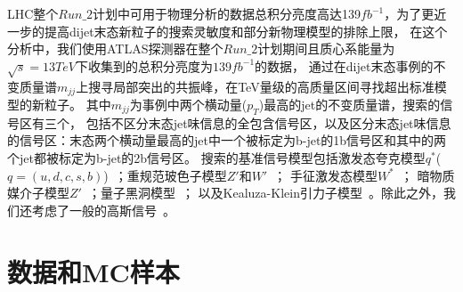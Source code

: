 LHC整个$Run\_2$计划中可用于物理分析的数据总积分亮度高达139$fb^{-1}$，为了更近一步的提高dijet末态新粒子的搜索灵敏度和部分新物理模型的排除上限，
在这个分析中，我们使用ATLAS探测器在整个$Run\_2$计划期间且质心系能量为$\sqrt{s}=13TeV$下收集到的总积分亮度为$139fb^{-1}$的数据，
通过在dijet末态事例的不变质量谱$m_{jj}$上搜寻局部突出的共振峰，在TeV量级的高质量区间寻找超出标准模型的新粒子。
其中$m_{jj}$为事例中两个横动量($p_{T}$)最高的jet的不变质量谱，搜索的信号区有三个，
包括不区分末态jet味信息的全包含信号区，以及区分末态jet味信息的信号区：末态两个横动量最高的jet中一个被标定为b-jet的1b信号区和其中的两个jet都被标定为b-jet的2b信号区。
搜索的基准信号模型包括激发态夸克模型$q^*$($q=(u,d,c,s,b)$)~\cite{qstar1,qstar2}；重规范玻色子模型$Z\prime$和$W\prime$~\cite{zprime1,zprime3,wprime1}；
手征激发态模型$W^*$~\cite{Chizhov:2009fc,Chizhov:2010jg}；
暗物质媒介子模型$Z\prime$~\cite{DM1,DM2,DM3}；量子黑洞模型~\cite{qbh1,qbh2}；
以及Kealuza-Klein引力子模型~\cite{RS1,RS2}。除此之外，我们还考虑了一般的高斯信号~\cite{EXOT-2013-11}。



\section{数据和MC样本}
\label{sec:DijetData}

